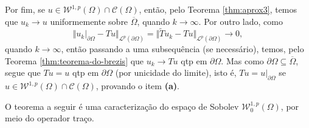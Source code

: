 \documentclass[a4paper, 11pt]{book}
\theoremstyle{definition}
\newcommand{\cC}{\mathcal{C}}
\newcommand{\cL}{\mathcal{L}}
\newcommand{\cW}{\mathcal{W}}
\begin{document}
\begin{prf}
    Por fim, se $u \in \cW^{1,p}(\Omega) \cap \cC(\Omega)$, então, pelo Teorema \ref{thm:aprox3}, temos que $u_k \to u$ uniformemente sobre $\overline\Omega$, quando $k \to \infty$.
    Por outro lado, como
    \[
        \Vert u_k |_{\partial\Omega} - Tu \Vert_{\cL^p(\partial \Omega)} = \Vert \widetilde T u_k - Tu \Vert_{\cL^p(\partial\Omega)} \to 0,
    \]
    quando $k \to \infty$, então passando a uma subsequência (se necessário), temos, pelo Teorema \ref{thm:teorema-do-brezis} que $u_k \to Tu$ qtp em $\partial \Omega$.
    Mas como $\partial \Omega \subseteq \overline\Omega$, segue que $Tu = u$ qtp em $\partial \Omega$ (por unicidade do limite), isto é, $Tu = u|_{\partial\Omega}$ se $u \in \cW^{1,p}(\Omega) \cap \cC(\Omega)$, provando o item \textbf{(a)}.
\end{prf}

O teorema a seguir é uma caracterização do espaço de Sobolev $\cW^{1,p}_0(\Omega)$, por meio do operador traço.
\end{document}
